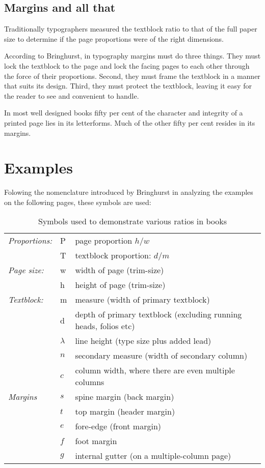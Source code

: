 \subsection{Margins and all that}

Traditionally typographers measured the textblock ratio to that of the full paper size to determine if the page proportions were of the right dimensions.

According to Bringhurst\cite{bringhurst2005}, in typography margins must do three things. They must lock the
textblock to the page and lock the facing pages to each other through the force of their proportions. Second, they must frame the textblock
in a manner that suits its design. Third, they must protect the textblock, leaving it easy for the reader to see and convenient to handle. 

In most well designed books fifty per cent of the character and integrity of a printed page lies in its letterforms. Much of the other fifty per cent resides in its margins.

\section{Examples}
Folowing the nomenclature introduced by Bringhurst in analyzing the examples on the following pages, 
these symbols are used:

\begin{table}[htbp]
\begin{tabular}{l l @{ = } p{6cm}}
\textit{Proportions:}      &P  &  page proportion $h/w$\\
~                      &T &  textblock proportion: $d/m$\\
\textit{Page size:}         &w &  width of page (trim-size)\\
~                      &h  & height of page (trim-size)\\
\textit{Textblock:}           &m & measure (width of primary textblock)\\
~                      &d  & depth of primary textblock (excluding running heads, folios etc)\\                      
~                      &$\lambda$ & line height (type size plus added lead)\\
~                      &$n$ & secondary measure (width of secondary column)\\
~                      &$c$  & column width, where there are even multiple columns\\
\textit{Margins}  &$s$  & spine margin (back margin)\\
~                      &$t$   & top margin (header margin)\\
                        &$e$  & fore-edge (front margin)\\
                        &$f$   & foot margin\\
                        &$g$  & internal gutter (on a multiple-column page)\\
\end{tabular}
\caption{Symbols used to demonstrate various ratios in books}
\end{table}
\medskip


